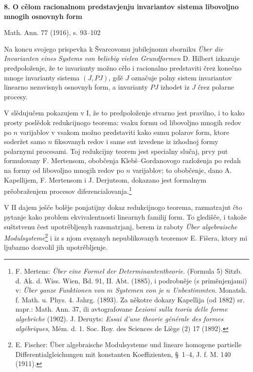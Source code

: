 \documentclass[11pt]{article}
\begin{document}
\begin{center}
{\Large\bfseries 8. O cělom racionalnom predstavjenju invariantov sistema libovoljno mnogih osnovnyh form}\par
\vspace{1.2em}
Math. Ann. 77 (1916), s. 93--102
\end{center}

\vspace{1em}

Na koncu svojego prispevka k Švarcovomu jubilejnomu sborniku \emph{Über die Invarianten eines Systems von beliebig vielen Grundformen} D. Hilbert izkazuje predpoloženje, že te invarianty možno cělo i racionalno predstaviti črez konečno mnoge invarianty sistema $(J,PJ)$, gdě $J$ označuje polny sistem invariantov linearno nezavisnyh osnovnyh form, a invarianty $PJ$ izhodet iz $J$ črez polarne procesy.

V slědujučem pokazujem v I, že to predpoloženje stvarno jest pravilno, i to kako prosty poslědok redukcijnogo teorema: vsaku formu od libovoljno mnogih redov po $n$ varijablov v vsakom možno predstaviti kako sumu polarov form, ktore soderžet samo $n$ fiksovanyh redov i same sut izvedene iz izhodnoj formy polarnymi procesami. Toj redukcijny teorem jest specialny slučaj, prvy put formulovany F. Mertensom, obobčenja Klebš--Gordanovogo razloženja po redah na formy od libovoljno mnogih redov po $n$ varijablov; to obobčenje, dano A. Kapellijem, F. Mertensom i J. Derjutsom, dokazano jest formalnym prěobraženjem procesov diferencialovanja.\footnote{F. Mertens: \emph{Über eine Formel der Determinantentheorie}. (Formula 5) Sitzb. d. Ak. d. Wiss. Wien, Bd. 91, II. Abt. (1885), i podrobněje (s priměnjenjami) v: \emph{Über ganze Funktionen von $m$ Systemen von je $n$ Unbestimmten}. Monatsh. f. Math. u. Phys. 4. Jahrg. (1893). Za někotre dokazy Kapellija (od 1882) sr. napr.: Math. Ann. 37, ili avtografovane \emph{Lezioni sulla teoria delle forme algebriche} (1902). J. Deruyts: \emph{Essai d'une theorie générale des formes algébriques}, Mém. d. 1. Soc. Roy. des Sciences de Liège (2) 17 (1892).}

V II dajem ješče bolěje ponjatijny dokaz redukcijnogo teorema, razmatrajut čto pytanje kako problem ekvivalentnosti linearnyh familij form. To gledišče, i takože suštstvenu čest upotrěbljenyh razsmatrjanj, berem iz raboty \emph{Über algebraische Modulsysteme}\footnote{E. Fischer: Über algebraische Modulsysteme und lineare homogene partielle Differentialgleichungen mit konstanten Koeffizienten, \S\ 1--4, J. f. M. 140 (1911).} i iz s njom svęzanyh nepublikovanyh teoremov E. Fišera, ktory mi ljubazno dozvolil jih upotrěbljenje.
\end{document}
